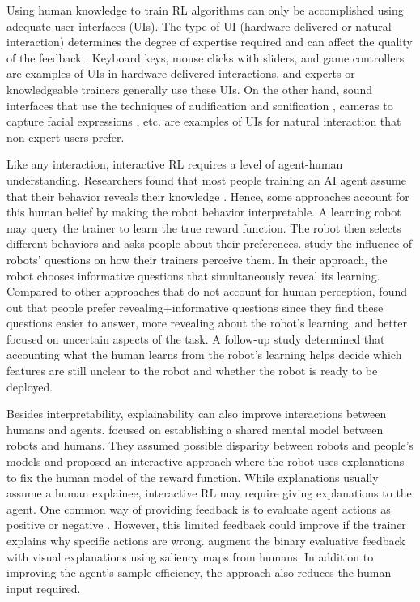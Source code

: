 \documentclass[twoside,11pt]{article}
\begin{document}
Using human knowledge to train RL algorithms can only be accomplished using adequate user interfaces (UIs). The type of UI (hardware-delivered or natural interaction) determines the degree of expertise required and can affect the quality of the feedback \citep{lin:20}. Keyboard keys, mouse clicks with sliders, and game controllers are examples of UIs in hardware-delivered interactions, and experts or knowledgeable trainers generally use these UIs. On the other hand, sound interfaces that use the techniques of audification and sonification \citep{Hermann:2011:Sonification, Saranti:2009:QuantumHarmonicOscSonification,kartoun:10,Scurto:2021:DesigningDeepRLHumanParameterExploration}, cameras to capture facial expressions \citep{arakawa:18}, etc. are examples of UIs for natural interaction that non-expert users prefer. 

Like any interaction, interactive RL requires a level of agent-human understanding. Researchers found that most people training an AI agent assume that their behavior reveals their knowledge \citep{habibian:21}. Hence, some approaches account for this human belief by making the robot behavior interpretable. A learning robot may query the trainer to learn the true reward function. The robot then selects different behaviors and asks people about their preferences. \cite{habibian:21} study the influence of robots' questions on how their trainers perceive them. In their approach, the robot chooses informative questions that simultaneously reveal its learning. Compared to other approaches that do not account for human perception, \cite{habibian:21} found out that people prefer revealing+informative questions since they find these questions easier to answer, more revealing about the robot's learning, and better focused on uncertain aspects of the task. A follow-up study determined that accounting what the human learns from the robot's learning helps decide which features are still unclear to the robot and whether the robot is ready to be deployed. 

Besides interpretability, explainability can also improve interactions between humans and agents. \citet{TabrezHayes:2019:xRLTextualExplanations} focused on establishing a shared mental model between robots and humans. They assumed possible disparity between robots and people's models and proposed an interactive approach where the robot uses explanations to fix the human model of the reward function. While explanations usually assume a human explainee, interactive RL may require giving explanations to the agent. One common way of providing feedback is to evaluate agent actions as positive or negative \citep{Knox:2008:TAMER,knox:13,arakawa:18,macglashan2017interactive}. However, this limited feedback could improve if the trainer explains why specific actions are wrong. \cite{guan2020explanation} augment the binary evaluative feedback with visual explanations using saliency maps from humans. In addition to improving the agent's sample efficiency, the approach also reduces the human input required. 
\end{document}
